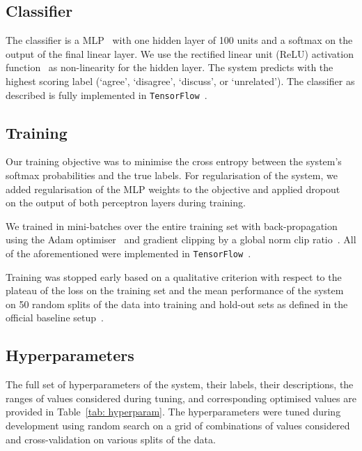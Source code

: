 \documentclass{article}
\begin{document}
\subsection{Classifier}

The classifier is a MLP~\cite{mlp} with one hidden layer of 100 units and a softmax on the output of the final linear layer. We use the rectified linear unit (ReLU) activation function~\cite{relu} as non-linearity for the hidden layer. The system predicts with the highest scoring label (`agree', `disagree', `discuss', or `unrelated'). The classifier as described is fully implemented in \texttt{TensorFlow}~\cite{tensorflow}.

\subsection{Training}

Our training objective was to minimise the cross entropy between the system's softmax probabilities and the true labels. For regularisation of the system, we added  regularisation of the MLP weights to the objective and applied dropout~\cite{drop} on the output of both perceptron layers during training.

We trained in mini-batches over the entire training set with back-propagation using the Adam optimiser~\cite{adam} and gradient clipping by a global norm clip ratio~\cite{grad}. All of the aforementioned were implemented in \texttt{TensorFlow}~\cite{tensorflow}.

Training was stopped early based on a qualitative criterion with respect to the plateau of the loss on the training set and the mean performance of the system on 50 random splits of the data into training and hold-out sets as defined in the official baseline setup~\cite{fncbase}.

\subsection{Hyperparameters}

The full set of hyperparameters of the system, their labels, their descriptions, the ranges of values considered during tuning, and corresponding optimised values are provided in Table~\ref{tab: hyperparam}.
The hyperparameters were tuned during development using random search on a grid of combinations of values considered and cross-validation on various splits of the data.
\end{document}
